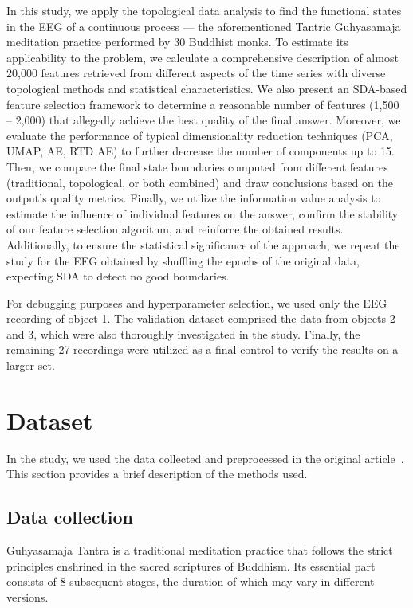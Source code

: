 \documentclass[10pt]{iopart}
\begin{document}
In this study, we apply the topological data analysis to find the functional states in the EEG of a continuous process --- the aforementioned Tantric Guhyasamaja meditation practice performed by 30 Buddhist monks. To estimate its applicability to the problem, we calculate a comprehensive description of almost 20,000 features retrieved from different aspects of the time series with diverse topological methods and statistical characteristics. We also present an SDA-based feature selection framework to determine a reasonable number of features (1,500 -- 2,000) that allegedly achieve the best quality of the final answer. Moreover, we evaluate the performance of typical dimensionality reduction techniques (PCA, UMAP, AE, RTD AE) to further decrease the number of components up to 15. Then, we compare the final state boundaries computed from different features (traditional, topological, or both combined) and draw conclusions based on the output's quality metrics. Finally, we utilize the information value analysis to estimate the influence of individual features on the answer, confirm the stability of our feature selection algorithm, and reinforce the obtained results. Additionally, to ensure the statistical significance of the approach, we repeat the study for the EEG obtained by shuffling the epochs of the original data, expecting SDA to detect no good boundaries.

For debugging purposes and hyperparameter selection, we used only the EEG recording of object 1. The validation dataset comprised the data from objects 2 and 3, which were also thoroughly investigated in the study. Finally, the remaining 27 recordings were utilized as a final control to verify the results on a larger set. 

\section{Dataset}

In the study, we used the data collected and preprocessed in the original article~\cite{SDA}. This section provides a brief description of the methods used.

\subsection{Data collection}

Guhyasamaja Tantra is a traditional meditation practice that follows the strict principles enshrined in the sacred scriptures of Buddhism. Its essential part consists of 8 subsequent stages, the duration of which may vary in different versions.
\end{document}
